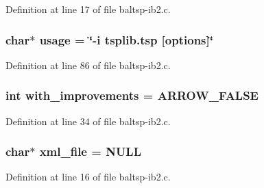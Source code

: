 Definition at line 17 of file baltsp-ib2.c.\hypertarget{bin_2baltsp-ib2_8c_adebe2487a2c5240ab6cd02c83add0bf}{
\subsubsection[{usage}]{\setlength{\rightskip}{0pt plus 5cm}char$\ast$ {\bf usage} = \char`\"{}-i tsplib.tsp \mbox{[}{\bf options}\mbox{]}\char`\"{}}}
\label{bin_2baltsp-ib2_8c_adebe2487a2c5240ab6cd02c83add0bf}




Definition at line 86 of file baltsp-ib2.c.\hypertarget{bin_2baltsp-ib2_8c_91079460b00ac08193d5ee47094f8f70}{
\subsubsection[{with\_\-improvements}]{\setlength{\rightskip}{0pt plus 5cm}int {\bf with\_\-improvements} = ARROW\_\-FALSE}}
\label{bin_2baltsp-ib2_8c_91079460b00ac08193d5ee47094f8f70}




Definition at line 34 of file baltsp-ib2.c.\hypertarget{bin_2baltsp-ib2_8c_bf4e392494984c6ef8259268eb1fe421}{
\subsubsection[{xml\_\-file}]{\setlength{\rightskip}{0pt plus 5cm}char$\ast$ {\bf xml\_\-file} = NULL}}
\label{bin_2baltsp-ib2_8c_bf4e392494984c6ef8259268eb1fe421}




Definition at line 16 of file baltsp-ib2.c.